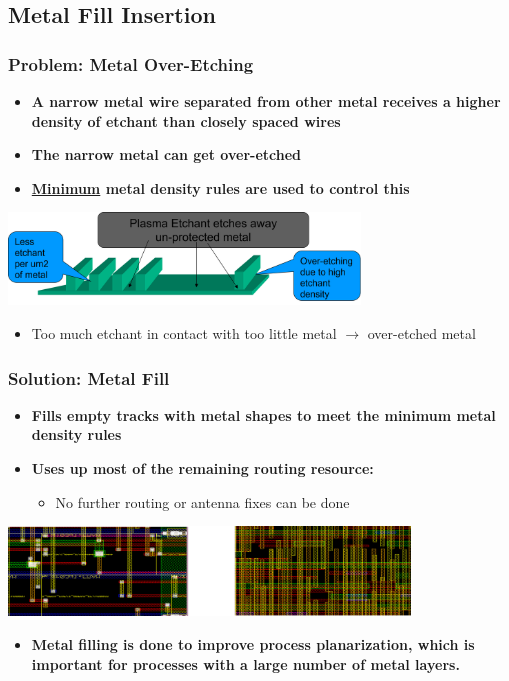 \documentclass[compress]{beamer}
\begin{document}
\subsection[Metal]{Metal Fill Insertion}
\begin{frame}
	\frametitle{Problem: Metal Over-Etching}
	\begin{itemize}
		\item \textbf{A narrow metal wire separated from other metal receives a higher density of etchant than closely spaced wires}
		\item \textbf{The narrow metal can get over-etched}
		\item \textbf{\underline{Minimum} metal density rules are used to control this}
	\end{itemize}
\begin{center}
	\includegraphics[width=0.7\textwidth]{Metal}
\end{center}
\begin{itemize}
	\item Too much etchant in contact with too little metal $\rightarrow$ over-etched metal
	
\end{itemize}
\end{frame}

\begin{frame}
	\frametitle{Solution: Metal Fill}
	\begin{itemize}
		\item \textbf{Fills empty tracks with metal shapes to meet the
		minimum metal density rules}
		\item \textbf{Uses up most of the remaining routing resource:}
		\begin{itemize}
			\item No further routing or antenna fixes can be done
		\end{itemize}
	\end{itemize}
\begin{center}
	\includegraphics[width=0.8\textwidth]{Fill}
\end{center}
\begin{itemize}
	\item \textbf{Metal filling is done to improve process planarization, which is important for processes with a large number of metal layers.}
\end{itemize}
\end{frame}
\end{document}
